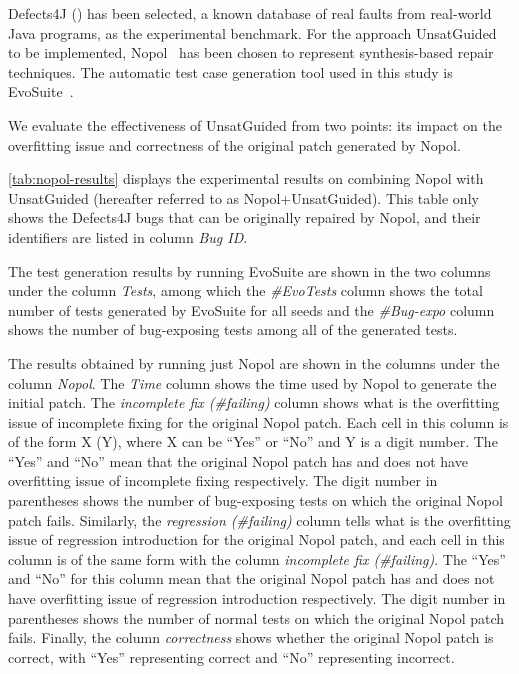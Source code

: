 Defects4J (\cite{JustJE2014}) has been selected, a known database of real faults from real-world Java programs, as the experimental benchmark.
For the approach UnsatGuided to be implemented, Nopol~\cite{nopol} has been chosen to represent synthesis-based repair techniques. 
The automatic test case generation tool used in this study is EvoSuite~\cite{ESECFSE11}.

We evaluate the effectiveness of UnsatGuided from two points: its impact on the overfitting issue and correctness of the original patch generated by Nopol.

\autoref{tab:nopol-results} displays the experimental results on combining Nopol with UnsatGuided (hereafter referred to as Nopol+\-Unsat\-Guided).
This table only shows the Defects4J bugs that can be originally repaired by Nopol, and their identifiers are listed in column \emph{Bug ID}. 

The test generation results by running EvoSuite are shown in the two columns under the column \emph{Tests}, among which the \emph{\#EvoTests} column shows the total number of tests generated by EvoSuite for all seeds and the \emph{\#Bug-expo} column shows the number of bug-exposing tests among all of the generated tests. 

The results obtained by running just Nopol are shown in the columns under the column \emph{Nopol}. 
The \emph{Time} column shows the time used by Nopol to generate the initial patch. 
The \emph{incomplete fix (\#failing)} column shows what is the overfitting issue of incomplete fixing for the original Nopol patch. 
Each cell in this column is of the form X (Y), where X can be ``Yes'' or ``No'' and Y is a digit number. 
The ``Yes'' and ``No'' mean that the original Nopol patch has and does not have overfitting issue of incomplete fixing respectively. 
The digit number in parentheses shows the number of bug-exposing tests on which the original Nopol patch fails. 
Similarly, the \emph{regression (\#failing)} column tells what is the overfitting issue of regression introduction for the original Nopol patch, and each cell in this column is of the same form with the column \emph{incomplete fix (\#failing)}. 
The ``Yes'' and ``No'' for this column mean that the original Nopol patch has and does not have overfitting issue of regression introduction respectively. 
The digit number in parentheses shows the number of normal tests on which the original Nopol patch fails. 
Finally, the column \emph{correctness} shows whether the original Nopol patch is correct, with ``Yes'' representing correct and ``No'' representing incorrect.


